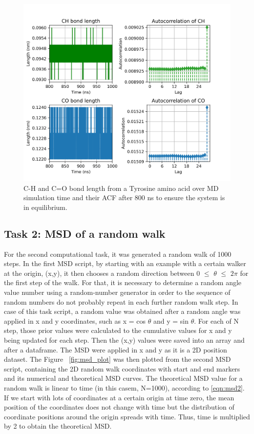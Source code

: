 \documentclass{article}
\begin{document}
\begin{figure}[H]
\includegraphics[width=\linewidth]{CO_CH_length_acf_plot.png}
\caption{C-H and C=O bond length from a Tyrosine amino acid over MD simulation time and their ACF after 800 ns to ensure the system is in equilibrium.}
\label{fig:acf_plot}
\end{figure}

\subsection{Task 2: MSD of a random walk}

For the second computational task, it was generated a random walk of 1000 steps. In the first MSD script, by starting with an example with a certain walker at the origin, (x,y), it then chooses a random direction between 0 $\leq$ $\theta$ $\leq$ $2\pi$ for the first step of the walk. For that, it is necessary to determine a random angle value number using a random-number generator in order to the sequence of random numbers do not probably repeat in each further random walk step. In case of this task script, a random value was obtained after a random angle was applied in x and y coordinates, such as x = cos $\theta$ and y = sin $\theta$. For each of N step, those prior values were calculated to the cumulative values for x and y being updated for each step. Then the (x,y) values were saved into an array and after a dataframe. The MSD were applied in x and y as it is a 2D position dataset. The Figure ~\ref{fig:msd_plot} was then plotted from the second MSD script, containing the 2D random walk coordinates with start and end markers and its numerical and theoretical MSD curves. The theoretical MSD value for a random walk is linear to time (in this casem, N=1000), according to \ref{eqn:msd2}. If we start with lots of coordinates at a certain origin at time zero, the mean position of the coordinates does not change with time but the distribution of coordinate positions around the origin spreads with time. Thus, time is multiplied by 2 to obtain the theoretical MSD.
\end{document}
